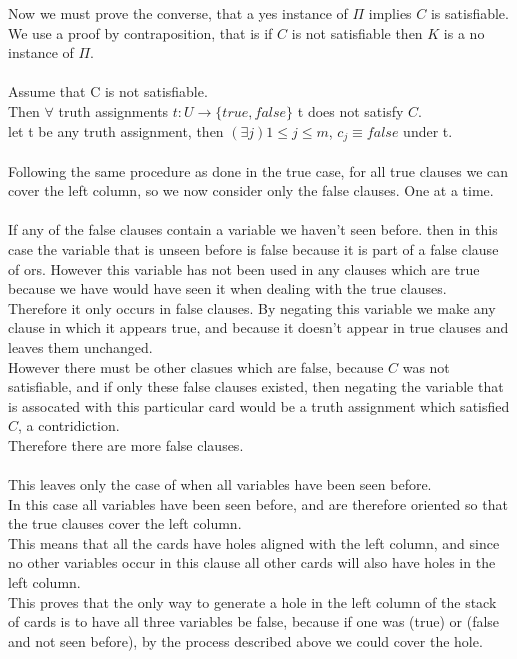 \documentclass{article}
\begin{document}
      Now we must prove the converse, that a yes instance of $\Pi$ implies $C$ is satisfiable.\\
      We use a proof by contraposition, that is if $C$ is not satisfiable then $K$ is a no instance of $\Pi$.\\
      \\
      Assume that C is not satisfiable.\\
      Then $\forall$ truth assignments $t:U \rightarrow \{true, false\}$ t does not satisfy $C$.\\
      let t be any truth assignment, then $(\exists j) 1 \leq j \leq m$, $c_{j} \equiv false$ under t.\\
      \\
      Following the same procedure as done in the true case, for all true clauses we can cover the left column, so we now consider only the false clauses. One at a time.\\
      \\
      If any of the false clauses contain a variable we haven't seen before.
      then in this case the variable that is unseen before is false because it is part of a false clause of ors.
      However this variable has not been used in any clauses which are true because we have would have seen it when dealing with the true clauses.\\
      Therefore it only occurs in false clauses. By negating this variable we make any clause in which it appears true, and because it doesn't appear in true clauses and leaves them unchanged.\\
      However there must be other clasues which are false, because $C$ was not satisfiable, and if only these false clauses existed, then negating the variable that is assocated with this particular card would be a truth assignment which satisfied $C$, a contridiction.\\
      Therefore there are more false clauses.\\
      \\
      This leaves only the case of when all variables have been seen before.\\
      In this case all variables have been seen before, and are therefore oriented so that the true clauses cover the left column.\\
      This means that all the cards have holes aligned with the left column, and since no other variables occur in this clause all other cards will also have holes in the left column.\\
      This proves that the only way to generate a hole in the left column of the stack of cards is to have all three variables be false, because if one was (true) or (false and not seen before), by the process described above we could cover the hole.
\end{document}

